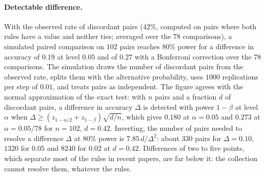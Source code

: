 \paragraph{Detectable difference.} With the observed rate of discordant pairs ($42\%$, computed on pairs where both rules have a value and neither ties; averaged over the $78$ comparisons), a simulated paired comparison on $102$ pairs reaches $80\%$ power for a difference in accuracy of $0.19$ at level $0.05$ and of $0.27$ with a Bonferroni correction over the $78$ comparisons. The simulation draws the number of discordant pairs from the observed rate, splits them with the alternative probability, uses $1000$ replications per step of $0.01$, and treats pairs as independent. The figure agrees with the normal approximation of the exact test: with $n$ pairs and a fraction $d$ of discordant pairs, a difference in accuracy $\Delta$ is detected with power $1-\beta$ at level $\alpha$ when $\Delta\ge (z_{1-\alpha/2}+z_{1-\beta})\sqrt{d/n}$, which gives $0.180$ at $\alpha=0.05$ and $0.273$ at $\alpha=0.05/78$ for $n=102$, $d=0.42$. Inverting, the number of pairs needed to resolve a difference $\Delta$ at $80\%$ power is $7.85\,d/\Delta^2$: about $330$ pairs for $\Delta=0.10$, $1320$ for $0.05$ and $8240$ for $0.02$ at $d=0.42$. Differences of two to five points, which separate most of the rules in recent papers, are far below it: the collection cannot resolve them, whatever the rules.

